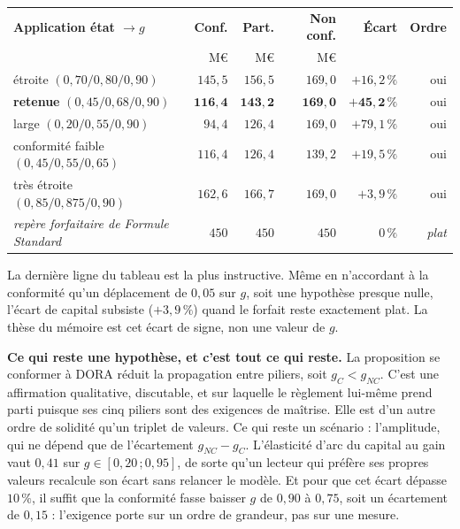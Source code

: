 \begin{center}\small
\renewcommand{\arraystretch}{1.25}
\begin{tabular}{@{}l r r r r r@{}}
\toprule
\textbf{Application état $\to g$} & \textbf{Conf.} & \textbf{Part.} & \textbf{Non conf.} &
\textbf{Écart} & \textbf{Ordre} \\
 & M\euro & M\euro & M\euro & & \\
\midrule
étroite $(0{,}70 / 0{,}80 / 0{,}90)$ & $145{,}5$ & $156{,}5$ & $169{,}0$ & $+16{,}2\,\%$ & oui \\
\textbf{retenue} $(0{,}45 / 0{,}68 / 0{,}90)$ & $\mathbf{116{,}4}$ & $\mathbf{143{,}2}$ &
$\mathbf{169{,}0}$ & $\mathbf{+45{,}2\,\%}$ & oui \\
large $(0{,}20 / 0{,}55 / 0{,}90)$ & $94{,}4$ & $126{,}4$ & $169{,}0$ & $+79{,}1\,\%$ & oui \\
conformité faible $(0{,}45 / 0{,}55 / 0{,}65)$ & $116{,}4$ & $126{,}4$ & $139{,}2$ &
$+19{,}5\,\%$ & oui \\
très étroite $(0{,}85 / 0{,}875 / 0{,}90)$ & $162{,}6$ & $166{,}7$ & $169{,}0$ & $+3{,}9\,\%$ &
oui \\
\midrule
\emph{repère forfaitaire de Formule Standard} & $450$ & $450$ & $450$ & $0\,\%$ & \emph{plat} \\
\bottomrule
\end{tabular}
\end{center}

\vspace{2pt}
La dernière ligne du tableau est la plus instructive. Même en n'accordant à la conformité qu'un
déplacement de $0{,}05$ sur $g$, soit une hypothèse presque nulle, l'écart de capital subsiste
($+3{,}9\,\%$) quand le forfait reste exactement plat. La thèse du mémoire est cet écart de signe, non une
valeur de $g$.

\begin{cle}
\textbf{Ce qui reste une hypothèse, et c'est tout ce qui reste.} La proposition
\og se conformer à DORA réduit la propagation entre piliers\fg{}, soit $g_C < g_{NC}$. C'est
une affirmation qualitative, discutable, et sur laquelle le règlement lui-même prend parti
puisque ses cinq piliers sont des exigences de maîtrise. Elle est d'un autre ordre de solidité
qu'un triplet de valeurs. Ce qui reste un scénario : l'amplitude, qui ne dépend que de
l'écartement $g_{NC}-g_C$. L'élasticité d'arc du capital au gain vaut $0{,}41$ sur
$g \in [0{,}20\,;0{,}95]$, de sorte qu'un lecteur qui préfère ses propres valeurs recalcule son
écart sans relancer le modèle. Et pour que cet écart dépasse $10\,\%$, il suffit que la
conformité fasse baisser $g$ de $0{,}90$ à $0{,}75$, soit un écartement de $0{,}15$ : l'exigence
porte sur un ordre de grandeur, pas sur une mesure.
\end{cle}

